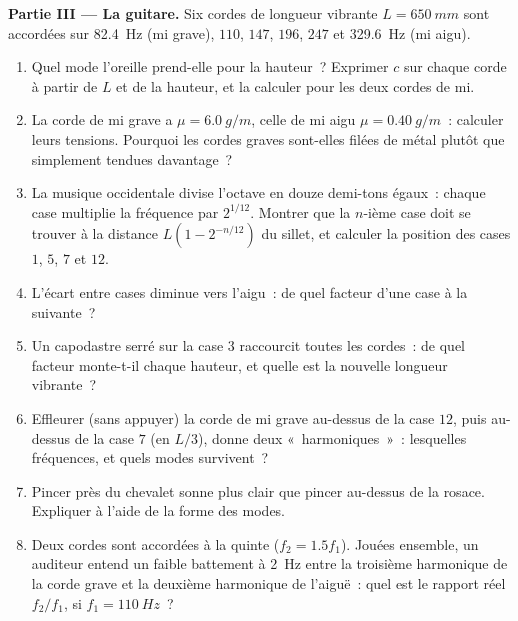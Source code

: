\begin{problem}
\medskip
\noindent\textbf{Partie III --- La guitare.}
Six cordes de longueur vibrante $L = \qty{650}{mm}$ sont accordées sur
\qty{82.4}{Hz} (mi grave), $110$, $147$, $196$, $247$ et \qty{329.6}{Hz}
(mi aigu).
\begin{enumerate}[resume]
  \item Quel mode l'oreille prend-elle pour la hauteur~? Exprimer $c$ sur
        chaque corde à partir de $L$ et de la hauteur, et la calculer
        pour les deux cordes de mi.
  \item La corde de mi grave a $\mu = \qty{6.0}{g/m}$, celle de mi aigu
        $\mu = \qty{0.40}{g/m}$~: calculer leurs tensions. Pourquoi les
        cordes graves sont-elles filées de métal plutôt que simplement
        tendues davantage~?
  \item La musique occidentale divise l'octave en douze demi-tons
        égaux~: chaque case multiplie la fréquence par $2^{1/12}$.
        Montrer que la $n$-ième case doit se trouver à la distance
        $L(1 - 2^{-n/12})$ du sillet, et calculer la position des cases
        $1$, $5$, $7$ et $12$.
  \item L'écart entre cases diminue vers l'aigu~: de quel facteur d'une
        case à la suivante~?
  \item Un capodastre serré sur la case $3$ raccourcit toutes les
        cordes~: de quel facteur monte-t-il chaque hauteur, et quelle est
        la nouvelle longueur vibrante~?
  \item Effleurer (sans appuyer) la corde de mi grave au-dessus de la
        case $12$, puis au-dessus de la case $7$ (en $L/3$), donne deux
        «~harmoniques~»~: lesquelles fréquences, et quels modes
        survivent~?
  \item Pincer près du chevalet sonne plus clair que pincer au-dessus de
        la rosace. Expliquer à l'aide de la forme des modes.
  \item Deux cordes sont accordées à la quinte ($f_2 = 1.5f_1$). Jouées
        ensemble, un auditeur entend un faible battement à \qty{2}{Hz}
        entre la troisième harmonique de la corde grave et la deuxième
        harmonique de l'aiguë~: quel est le rapport réel $f_2/f_1$, si
        $f_1 = \qty{110}{Hz}$~?
\end{enumerate}


\end{problem}
